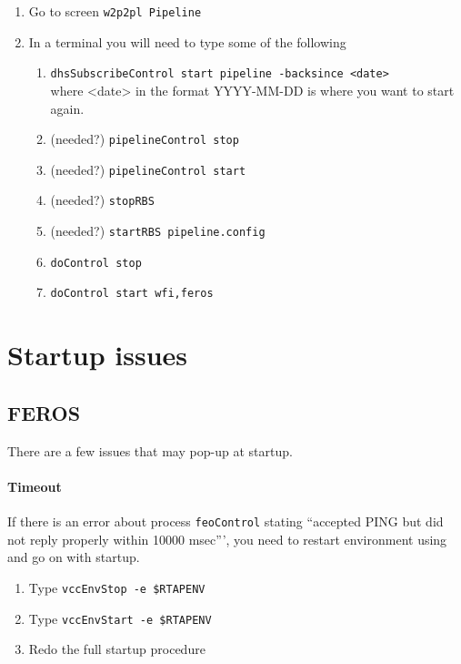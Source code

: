 \documentclass[11pt,fleqn,a4paper]{book}
\begin{document}
\label{proc:DHrestart}
\begin{enumerate} 
    \item Go to screen \texttt{\gls{w2p2pl} Pipeline}
    \item In a terminal you will need to type some of the following
        \begin{enumerate}
            \item \texttt{dhsSubscribeControl start pipeline -backsince <date>}\\where <date> in the format YYYY-MM-DD is where you want to start again.
            \item (needed?) \texttt{pipelineControl stop}
            \item (needed?) \texttt{pipelineControl start}
            \item (needed?) \texttt{stopRBS}
            \item (needed?) \texttt{startRBS pipeline.config}
            \item \texttt{doControl stop}
            \item \texttt{doControl start wfi,feros}
        \end{enumerate}
\end{enumerate}

\section{Startup issues}

\subsection{FEROS}
\label{sec:ferosstartuptimeout}

There are a few issues that may pop-up at startup.

\paragraph{Timeout}

If there is an error about process \texttt{feoControl} stating ``accepted PING but did not reply properly within 10000 msec''', you need to restart \gls{environment} using  and go on with startup.

\label{proc:restartenv}
\begin{enumerate}
\item Type \texttt{vccEnvStop -e \$RTAPENV}
\item Type \texttt{vccEnvStart -e \$RTAPENV}
\item Redo the full startup procedure
\end{enumerate}
 
\end{document}

